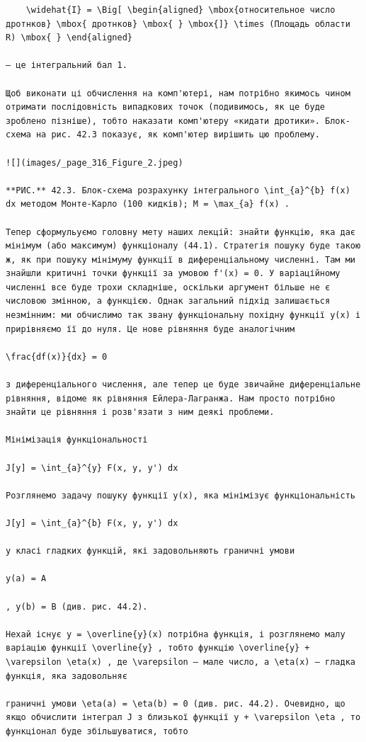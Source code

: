 \documentclass[
  ukrainian,
]{article}
\begin{document}
\begin{verbatim}
    \widehat{I} = \Big[ \begin{aligned} \mbox{относительное число дротнков} \mbox{ дротнков} \mbox{ } \mbox{]} \times (Площадь области R) \mbox{ } \end{aligned}

— це інтегральний бал 1.

Щоб виконати ці обчислення на комп'ютері, нам потрібно якимось чином отримати послідовність випадкових точок (подивимось, як це буде зроблено пізніше), тобто наказати комп'ютеру «кидати дротики». Блок-схема на рис. 42.3 показує, як комп'ютер вирішить цю проблему.

![](images/_page_316_Figure_2.jpeg)

**РИС.** 42.3. Блок-схема розрахунку інтегрального \int_{a}^{b} f(x) dx методом Монте-Карло (100 кидків); M = \max_{a} f(x) .

Тепер сформульуємо головну мету наших лекцій: знайти функцію, яка дає мінімум (або максимум) функціоналу (44.1). Стратегія пошуку буде такою ж, як при пошуку мінімуму функції в диференціальному численні. Там ми знайшли критичні точки функції за умовою f'(x) = 0. У варіаційному численні все буде трохи складніше, оскільки аргумент більше не є числовою змінною, а функцією. Однак загальний підхід залишається незмінним: ми обчислимо так звану функціональну похідну функції y(x) і прирівняємо її до нуля. Це нове рівняння буде аналогічним

\frac{df(x)}{dx} = 0

з диференціального числення, але тепер це буде звичайне диференціальне рівняння, відоме як рівняння Ейлера-Лагранжа. Нам просто потрібно знайти це рівняння і розв'язати з ним деякі проблеми.

Мінімізація функціональності

J[y] = \int_{a}^{y} F(x, y, y') dx

Розглянемо задачу пошуку функції y(x), яка мінімізує функціональність

J[y] = \int_{a}^{b} F(x, y, y') dx

у класі гладких функцій, які задовольняють граничні умови

y(a) = A

, y(b) = B (див. рис. 44.2).

Нехай існує y = \overline{y}(x) потрібна функція, і розглянемо малу варіацію функції \overline{y} , тобто функцію \overline{y} + \varepsilon \eta(x) , де \varepsilon — мале число, а \eta(x) — гладка функція, яка задовольняє

граничні умови \eta(a) = \eta(b) = 0 (див. рис. 44.2). Очевидно, що якщо обчислити інтеграл J з близької функції y + \varepsilon \eta , то функціонал буде збільшуватися, тобто


\end{verbatim}
\end{document}

